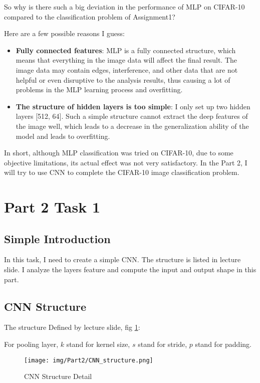 So why is there such a big deviation in the performance of MLP on CIFAR-10 compared to the classification problem of Assignment1?

Here are a few possible reasons I guess:

\begin{itemize}
  \item {\textbf{Fully connected features}:
      MLP is a fully connected structure, which means that everything in the image data will affect the final result.
      The image data may contain edges, interference, and other data that are not helpful or even disruptive to the analysis results, thus causing a lot of problems in the MLP learning process and overfitting.
    }
  \item {\textbf{The structure of hidden layers is too simple}:
      I only set up two hidden layers [512, 64].
      Such a simple structure cannot extract the deep features of the image well, which leads to a decrease in the generalization ability of the model and leads to overfitting.
    }
\end{itemize}

In short, although MLP classification was tried on CIFAR-10, due to some objective limitations, its actual effect was not very satisfactory.
In the Part 2, I will try to use CNN to complete the CIFAR-10 image classification problem.

\section{Part 2 Task 1}

\subsection{Simple Introduction}

In this task, I need to create a simple CNN. The structure is listed in lecture slide.
I analyze the layers feature and compute the input and output shape in this part.

\subsection{CNN Structure}

The structure Defined by lecture slide, fig \ref{fig:p2_cnn_structure}:

For pooling layer, $k$ stand for kernel size, $s$ stand for stride, $p$ stand for padding.

\begin{figure}[!htbp]
  \centering
  \texttt{[image: img/Part2/CNN\_structure.png]}
  \caption{CNN Structure Detail}
  \label{fig:p2_cnn_structure}
\end{figure}

